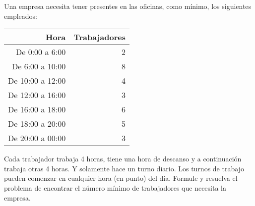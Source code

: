 \documentclass[twoside]{article}
\begin{document}
\newpage

\begin{ejercicio}{11}
Una empresa necesita tener presentes en las oficinas, como mínimo, los siguientes empleados:
\begin{center}
\begin{tabular}{r r}
\hline
Hora & Trabajadores\\
\hline
\hline
De 0:00 a 6:00 & 2\\
De 6:00 a 10:00 & 8\\
De 10:00 a 12:00 & 4\\
De 12:00 a 16:00 & 3\\
De 16:00 a 18:00 & 6\\
De 18:00 a 20:00 & 5\\
De 20:00 a 00:00 & 3\\
\hline
\end{tabular}
\end{center}
Cada trabajador trabaja 4 horas, tiene una hora de descanso y a continuación trabaja otras 4 horas. Y solamente hace un turno diario. Los turnos de trabajo pueden comenzar en cualquier hora (en punto) del día. Formule y resuelva el problema de encontrar el número mínimo de trabajadores que necesita la empresa.
\end{ejercicio}
\begin{solucion}
\end{solucion}

\newpage

\newpage
\end{document}
